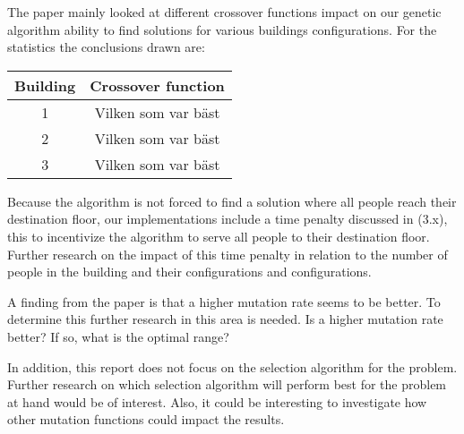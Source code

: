 The paper mainly looked at different crossover functions impact on our genetic algorithm ability to find solutions for various buildings configurations. For the statistics the conclusions drawn are:

\begin{center}
	\begin{tabular}{|c|c|}
		\hline
		Building & Crossover function  \\ \hline
		1        & Vilken som var bäst \\ \hline
		2        & Vilken som var bäst \\ \hline
		3        & Vilken som var bäst \\ \hline
	\end{tabular}
\end{center}
Because the algorithm is not forced to find a solution where all people reach their destination floor, our implementations include a time penalty discussed in (3.x), this to incentivize the algorithm to serve all people to their destination floor. Further research on the impact of this time penalty in relation to the number of people in the building and their configurations and configurations.

A finding from the paper is that a higher mutation rate seems to be better. To determine this further research in this area is needed. Is a higher mutation rate better? If so, what is the optimal range?

In addition, this report does not focus on the selection algorithm for the problem. Further research on which selection algorithm will perform best for the problem at hand would be of interest. Also, it could be interesting to investigate how other mutation functions could impact the results.